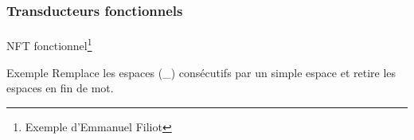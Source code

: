 \frametitle{Transducteurs fonctionnels}
\framesubtitle{}

NFT fonctionnel\footnote{Exemple d'Emmanuel Filiot}
	
	
\begin{exampleblock}{Exemple}
	Remplace les espaces (\_) consécutifs par un simple espace et retire les espaces en fin de mot.	
\end{exampleblock}